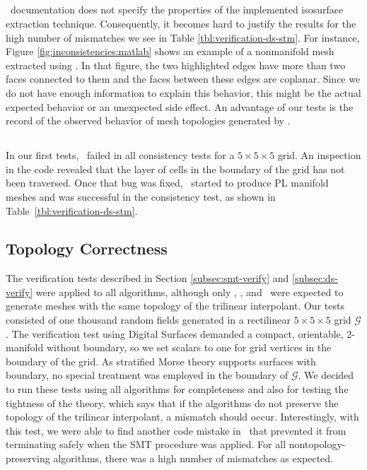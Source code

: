 \subsection{\matlab}

\matlab\ documentation does not specify the properties of the
implemented isosurface extraction technique. Consequently, it becomes
hard to justify the results for the high number of mismatches we see
in Table \ref{tbl:verification-ds-stm}.  For instance, Figure
\ref{fig:inconsistencies:matlab} shows an example of a nonmanifold
mesh extracted using \matlab. In that figure, the two highlighted
edges have more than two faces connected to them and the faces between
these edges are coplanar.  Since we do not have enough information to
explain this behavior, this might be the actual expected behavior or
an unexpected side effect. An advantage of our tests is the record of
the observed behavior of mesh topologies generated by \matlab.

\subsection{\macet}

In our first tests, \macet\ failed in all consistency tests for a $5 \times 5 \times 5$ grid. 
An inspection in the code revealed that the layer of cells in the boundary of the grid
has not been traversed. Once that bug was fixed, \macet\ started to produce
PL manifold
meshes and was successful in the consistency test, as shown in Table~\ref{tbl:verification-ds-stm}.

\subsection{Topology Correctness}
\label{sec:correctness}

The verification tests described in Section \ref{subsec:smt-verify}
and \ref{subsec:ds-verify} were applied to all algorithms, although
only \mclewiner, \deliso, and \mcsimpleflow\ were expected to generate
meshes with the same topology of the trilinear interpolant. Our tests
consisted of one thousand random fields generated in a rectilinear $5
\times 5 \times 5$ grid $\mathcal{G}$.  The verification test using
Digital Surfaces demanded a compact, orientable, 2-manifold without
boundary, so we set scalars to one for grid vertices in the
boundary of the grid.  As stratified Morse theory supports surfaces
with boundary, no special treatment was employed in the boundary of
$\mathcal{G}$. We decided to run these tests using all algorithms for
completeness and also for testing the tightness of the theory, which
says that if the algorithms do not preserve the topology of the
trilinear interpolant, a mismatch should occur.  Interestingly, with
this test, we were able to find another code mistake in \macet\ that
prevented it from terminating safely when the SMT procedure was applied. 
For all nontopology-preserving algorithms, there was a high
number of mismatches as expected.

